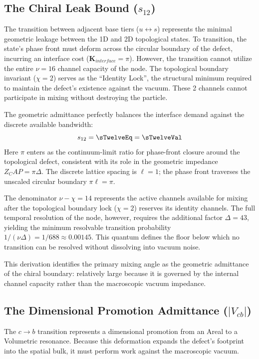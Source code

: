 \subsection{The Chiral Leak Bound (\texorpdfstring{$s_{12}$}{s12})}
The transition between adjacent base tiers ($u \leftrightarrow s$) represents the minimal geometric leakage between the 1D and 2D topological states. To transition, the state's phase front must deform across the circular boundary of the defect, incurring an interface cost ($\mathbf{K}_{interface} = \pi$). However, the transition cannot utilize the entire $\nu=16$ channel capacity of the node. The topological boundary invariant ($\chi=2$) serves as the ``Identity Lock'', the structural minimum required to maintain the defect's existence against the vacuum. These 2 channels cannot participate in mixing without destroying the particle. 

The geometric admittance perfectly balances the interface demand against the discrete available bandwidth:
\begin{equation}
    s_{12} = \sTwelveEq = \sTwelveVal
\end{equation}
Here $\pi$ enters as the continuum-limit ratio for phase-front closure around the topological defect, consistent with its role in the geometric impedance $Z_CAP = \pi \Delta$. The discrete lattice spacing is $\ell = 1$; the phase front traverses the unscaled circular boundary $\pi\ell = \pi$.

The denominator $\nu - \chi = 14$ represents the active channels available for mixing after the topological boundary lock ($\chi = 2$) reserves its identity channels. The full temporal resolution of the node, however, requires the additional factor $\Delta = 43$, yielding the minimum resolvable transition probability $1/(\nu\Delta) = 1/688 \approx 0.00145$. This quantum defines the floor below which no transition can be resolved without dissolving into vacuum noise.

This derivation identifies the primary mixing angle as the geometric admittance of the chiral boundary: relatively large because it is governed by the internal channel capacity rather than the macroscopic vacuum impedance. \sTwelveAccText



\subsection{The Dimensional Promotion Admittance (\texorpdfstring{$|V_{cb}|$}{Vcb})}
The $c \rightarrow b$ transition represents a dimensional promotion from an Areal to a Volumetric resonance. Because this deformation expands the defect's footprint into the spatial bulk, it must perform work against the macroscopic vacuum.

